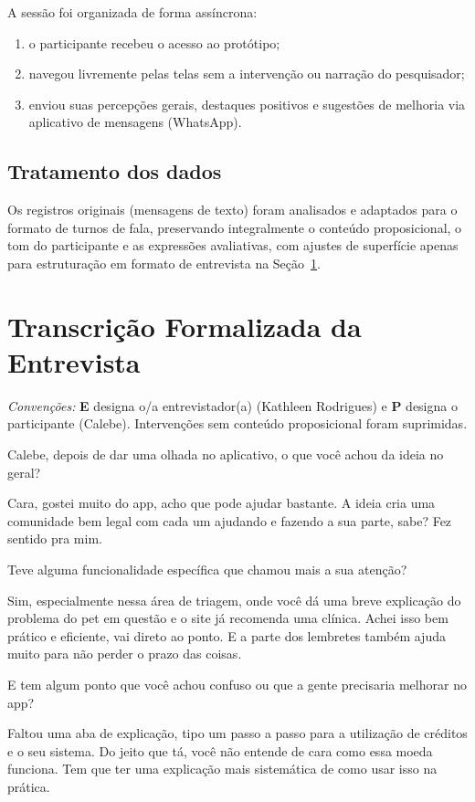 \documentclass[12pt,a4paper]{article}
\newenvironment{turnos}
  {\begin{list}{}{%
     \setlength{\leftmargin}{2.2cm}%
     \setlength{\labelwidth}{2.0cm}%
     \setlength{\labelsep}{0.2cm}%
     \setlength{\itemsep}{0.6em}%
     \setlength{\parsep}{0pt}}}
  {\end{list}}
\newcommand{\fala}[1]{\item[\textbf{#1}\hfill]}
\newcommand{\entrevistador}{Kathleen Rodrigues}
\newcommand{\participante}{Calebe}
\begin{document}
A sessão foi organizada de forma assíncrona:
\begin{enumerate}[label=\textbf{\arabic*.}]
  \item o participante recebeu o acesso ao protótipo;
  \item navegou livremente pelas telas sem a intervenção ou narração do pesquisador;
  \item enviou suas percepções gerais, destaques positivos e sugestões de melhoria via aplicativo de mensagens (WhatsApp).
\end{enumerate}

\subsection{Tratamento dos dados}

Os registros originais (mensagens de texto) foram analisados e adaptados para o formato de turnos de fala, preservando integralmente o conteúdo proposicional, o tom do participante e as expressões avaliativas, com ajustes de superfície apenas para estruturação em formato de entrevista na Seção~\ref{sec:transcricao}.

\section{Transcrição Formalizada da Entrevista}
\label{sec:transcricao}

\noindent\textit{Convenções:} \textbf{E} designa o/a entrevistador(a) (\entrevistador{}) e \textbf{P} designa o participante (\participante{}). Intervenções sem conteúdo proposicional foram suprimidas.

\begin{turnos}

\fala{E:} Calebe, depois de dar uma olhada no aplicativo, o que você achou da ideia no geral?

\fala{P:} Cara, gostei muito do app, acho que pode ajudar bastante. A ideia cria uma comunidade bem legal com cada um ajudando e fazendo a sua parte, sabe? Fez sentido pra mim.

\fala{E:} Teve alguma funcionalidade específica que chamou mais a sua atenção?

\fala{P:} Sim, especialmente nessa área de triagem, onde você dá uma breve explicação do problema do pet em questão e o site já recomenda uma clínica. Achei isso bem prático e eficiente, vai direto ao ponto. E a parte dos lembretes também ajuda muito para não perder o prazo das coisas.

\fala{E:} E tem algum ponto que você achou confuso ou que a gente precisaria melhorar no app?

\fala{P:} Faltou uma aba de explicação, tipo um passo a passo para a utilização de créditos e o seu sistema. Do jeito que tá, você não entende de cara como essa moeda funciona. Tem que ter uma explicação mais sistemática de como usar isso na prática.

\end{turnos}
\end{document}
